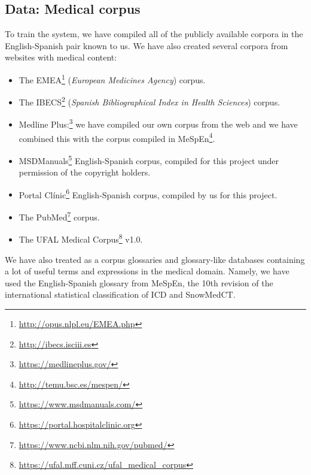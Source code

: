 \documentclass[output=paper]{langsci/langscibook}
\begin{document}
\subsection{Data: Medical corpus} \label{DataMedicalCorpus}

To train the system, we have compiled all of the publicly available corpora in the English-Spanish pair known to us. We have also created several corpora from websites with medical content:

\begin{itemize}
\item The EMEA\footnote{\url{http://opus.nlpl.eu/EMEA.php}} (\emph{European Medicines Agency}) corpus. 
\item The IBECS\footnote{\url{http://ibecs.isciii.es}} (\emph{Spanish Bibliographical Index in Health Sciences}) corpus.
\item Medline Plus:\footnote{\url{https://medlineplus.gov/}} we have compiled our own corpus from the web and we have combined this with the corpus compiled in MeSpEn\footnote{\url{http://temu.bsc.es/mespen/}}.
\item MSDManuals\footnote{\url{https://www.msdmanuals.com/}} English-Spanish corpus, compiled for this project under permission of the copyright holders.
\item Portal Clínic\footnote{\url{https://portal.hospitalclinic.org}} English-Spanish corpus, compiled by us for this project.
\item The PubMed\footnote{\url{https://www.ncbi.nlm.nih.gov/pubmed/}} corpus.
\item The UFAL Medical Corpus\footnote{\url{https://ufal.mff.cuni.cz/ufal_medical_corpus}} v1.0.
\end{itemize}

We have also treated as a corpus glossaries and glossary-like databases containing a lot of useful terms and expressions in the medical domain. Namely, we have used the English-Spanish glossary from MeSpEn, the 10th revision of the international statistical classification of ICD and SnowMedCT.

\end{document}
